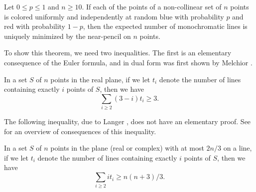 \documentclass[a4paper,11pt,leqno]{article}
\begin{document}
\begin{theorem}\label{thm:random}
Let $0\leq p\leq 1$ and $n\geq 10$.
If each of the points of a non-collinear set of $n$ points is colored uniformly and independently at random blue with probability $p$ and red with probability $1-p$, then the expected number of monochromatic lines is uniquely minimized by the near-pencil on $n$ points.
\end{theorem}

To show this theorem, we need two inequalities.
The first is an elementary consequence of the Euler formula, and in dual form was first shown by Melchior \cite{melchior1941vielseite}.
\begin{lemma}
In a set $S$ of $n$ points in the real plane, if we let $t_i$ denote the number of lines containing exactly $i$ points of $S$, then we have
\[\sum_{i\geq 2} (3-i)t_i\geq 3.\]
\end{lemma}
The following inequality, due to Langer \cite[Proposition 11.3.1]{langer2003}, does not have an elementary proof.
See \cite{deZeeuw-survey} for an overview of consequences of this inequality.
\begin{lemma}\label{lemma:Langer}
In a set $S$ of $n$ points in the plane (real or complex) with at most $2n/3$ on a line, if we let $t_i$ denote the number of lines containing exactly $i$ points of $S$, then we have
\[\sum_{i\geq 2} it_i\geq n(n+3)/3.\]
\end{lemma}
\end{document}
